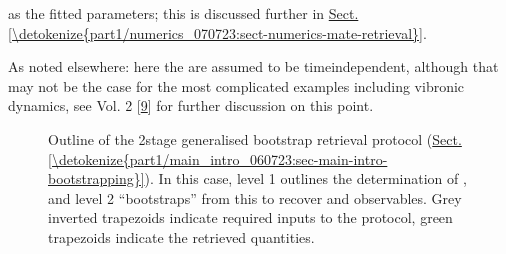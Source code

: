 \documentclass[letterpaper,table,10pt,english]{jupyterBook}
\begin{document}
{\hyperref[\detokenize{backmatter/glossary:term-radial-matrix-elements}]{}} as the fitted parameters; this is discussed further in \hyperref[\detokenize{part1/numerics_070723:sect-numerics-mate-retrieval}]{Sect.\@ \ref{\detokenize{part1/numerics_070723:sect-numerics-mate-retrieval}}}. %
\begin{footnote}[1]\sphinxAtStartFootnote
As noted elsewhere: here the {\hyperref[\detokenize{backmatter/glossary:term-radial-matrix-elements}]{}} are assumed to be time\sphinxhyphen{}independent, although that may not be the case for the most complicated examples including vibronic dynamics, see  Vol. 2 {[}\hyperlink{cite.backmatter/bibliography:id676}{9}{]} for further discussion on this point.
%
\end{footnote}

\begin{figure}[htbp]
\centering
\capstart

\noindent{}
\caption{Outline of the 2\sphinxhyphen{}stage generalised bootstrap {\hyperref[\detokenize{backmatter/glossary:term-radial-matrix-elements}]{}} retrieval protocol (\hyperref[\detokenize{part1/main_intro_060723:sec-main-intro-bootstrapping}]{Sect.\@ \ref{\detokenize{part1/main_intro_060723:sec-main-intro-bootstrapping}}}). In this case, level 1 outlines the determination of {\hyperref[\detokenize{backmatter/glossary:term-ADMs}]{}}, and level 2 “bootstraps” from this to recover {\hyperref[\detokenize{backmatter/glossary:term-radial-matrix-elements}]{}} and {\hyperref[\detokenize{backmatter/glossary:term-MF}]{}} observables. Grey inverted trapezoids indicate required inputs to the protocol, green trapezoids indicate the retrieved quantities.}\label{\detokenize{part1/numerics_070723:fig-bootstrap-fitting-diag}}\end{figure}
\end{document}
